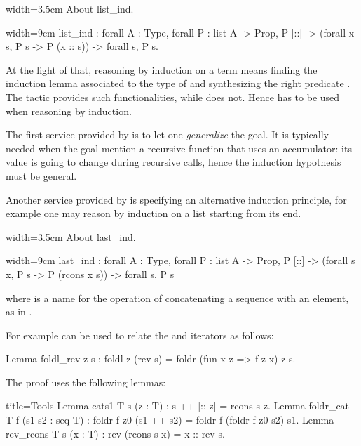 \begin{coq}{}{width=3.5cm}
About list_ind.
\end{coq}
\begin{coqout}{}{width=9cm}
list_ind : forall A : Type, forall P : list A -> Prop,
  P [::] -> (forall x s, P s -> P (x :: s)) -> forall s, P s.
\end{coqout}

At the light of that, reasoning by induction on a term  means
finding the induction lemma associated to the type of  and synthesizing
the right predicate .  The  tactic provides such
functionalities, while  does not.  Hence 
has to be used when reasoning by induction.

The first service provided by  is to let one \emph{generalize}
the goal.  It is typically needed when the goal mention a recursive function
that uses an accumulator: its value is going to change during recursive calls,
hence the induction hypothesis must be general.

Another service provided by  is specifying an alternative
induction principle, for example one may reason by induction on
a list starting from its end.


\begin{coq}{}{width=3.5cm}
About last_ind.
\end{coq}
\begin{coqout}{}{width=9cm}
last_ind : forall A : Type, forall P : list A -> Prop,
  P [::] -> (forall s x, P s -> P (rcons x s)) -> forall s, P s
\end{coqout}
where  is a name for the operation of concatenating
a sequence with an element, as in .

For example  can be used to relate the
 and  iterators as follows:

\begin{coq}{}{}
Lemma foldl_rev z s : foldl z (rev s) = foldr (fun x z => f z x) z s.
\end{coq}

The proof uses the following lemmas:

\begin{coq}{}{title=Tools}
Lemma cats1 T s (z : T) : s ++ [:: z] = rcons s z.
Lemma foldr_cat T f (s1 s2 : seq T) :
  foldr f z0 (s1 ++ s2) = foldr f (foldr f z0 s2) s1.
Lemma rev_rcons T s (x : T) : rev (rcons s x) = x :: rev s.
\end{coq}

